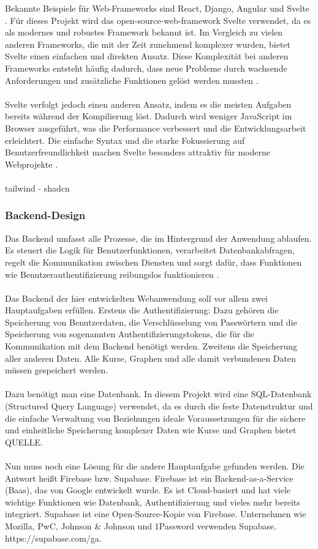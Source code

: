 Bekannte Beispiele für Web-Frameworks sind React, Django, Angular und Svelte \parencite{mdn-intro-to-cs-frameworks}. Für dieses Projekt wird das open-source-web-framework Svelte verwendet, da es als modernes und robustes Framework bekannt ist. Im Vergleich zu vielen anderen Frameworks, die mit der Zeit zunehmend komplexer wurden, bietet Svelte einen einfachen und direkten Ansatz. Diese Komplexität bei anderen Frameworks entsteht häufig dadurch, dass neue Probleme durch wachsende Anforderungen und zusätzliche Funktionen gelöst werden mussten \parencite{svelte-rethinking}.\\\\
Svelte verfolgt jedoch einen anderen Ansatz, indem es die meisten Aufgaben bereits während der Kompilierung löst. Dadurch wird weniger JavaScript im Browser ausgeführt, was die Performance verbessert und die Entwicklungsarbeit erleichtert. Die einfache Syntax und die starke Fokussierung auf Benutzerfreundlichkeit machen Svelte besonders attraktiv für moderne Webprojekte \parencite{svelte-rethinking}.\\\\
tailwind - shadcn
\newpage
\subsubsection{Backend-Design}
Das Backend umfasst alle Prozesse, die im Hintergrund der Anwendung ablaufen. Es steuert die Logik für Benutzerfunktionen, verarbeitet Datenbankabfragen, regelt die Kommunikation zwischen Diensten und sorgt dafür, dass Funktionen wie Benutzerauthentifizierung reibungslos funktionieren \parencite{nam-le-thanh-web-designer-2023}.\\\\
Das Backend der hier entwickelten Webanwendung soll vor allem zwei Hauptaufgaben erfüllen. Erstens die Authentifizierung: Dazu gehören die Speicherung von Benutzerdaten, die Verschlüsselung von Passwörtern und die Speicherung von sogenannten Authentifizierungstokens, die für die Kommunikation mit dem Backend benötigt werden. Zweitens die Speicherung aller anderen Daten. Alle Kurse, Graphen und alle damit verbundenen Daten müssen gespeichert werden.\\\\
Dazu benötigt man eine Datenbank. In diesem Projekt wird eine SQL-Datenbank (Structured Query Language) verwendet, da es durch die feste Datenstruktur und die einfache Verwaltung von Beziehungen ideale Voraussetzungen für die sichere und einheitliche Speicherung komplexer Daten wie Kurse und Graphen bietet QUELLE.\\\\
Nun muss noch eine Lösung für die andere Hauptaufgabe gefunden werden. Die Antwort heißt Firebase bzw. Supabase. Firebase ist ein Backend-as-a-Service (Baas), das von Google entwickelt wurde. Es ist Cloud-basiert und hat viele wichtige Funktionen wie Datenbank, Authentifizierung und vieles mehr bereits integriert. Supabase ist eine Open-Source-Kopie von Firebase. Unternehmen wie Mozilla, PwC, Johnson \& Johnson und 1Password verwenden Supabase. https://supabase.com/ga.\\\\

